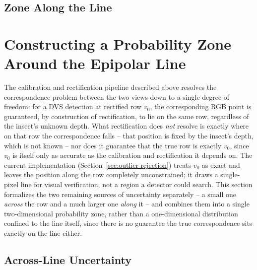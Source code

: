 \subsection{Zone Along the Line}
\label{sec:zone-along-line}






\section{Constructing a Probability Zone Around the Epipolar Line}
\label{sec:probability-zones-old}

The calibration and rectification pipeline described above resolves the
correspondence problem between the two views down to a single degree of
freedom: for a DVS detection at rectified row $v_0$, the corresponding RGB
point is guaranteed, by construction of rectification, to lie on the same
row, regardless of the insect's unknown depth. What rectification does
\emph{not} resolve is exactly where on that row the correspondence falls --
that position is fixed by the insect's depth, which is not known -- nor does
it guarantee that the true row is exactly $v_0$, since $v_0$ is itself only
as accurate as the calibration and rectification it depends on. The current
implementation (Section~\ref{sec:outlier-rejection}) treats $v_0$ as exact
and leaves the position along the row completely unconstrained; it draws a
single-pixel line for visual verification, not a region a detector could
search. This section formalizes the two remaining sources of uncertainty
separately -- a small one \emph{across} the row and a much larger one
\emph{along} it -- and combines them into a single two-dimensional
probability zone, rather than a one-dimensional distribution confined to the
line itself, since there is no guarantee the true correspondence sits
exactly on the line either.

\subsection{Across-Line Uncertainty}
\label{sec:zone-across-line}

